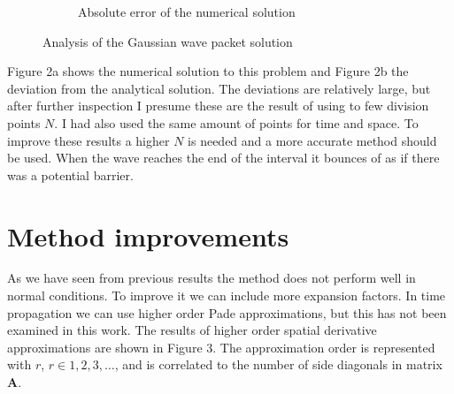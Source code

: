 \documentclass[12pt, a4paper]{article}
\begin{document}
\begin{figure}[hbtp]
\begin{subfigure}{0.5\textwidth}
  \caption{Absolute error of the numerical solution} \label{fig:b}
  \end{subfigure}
  \caption{Analysis of the Gaussian wave packet solution} \label{fig:1}
\end{figure}
 
Figure 2a shows the numerical solution to this problem and Figure 2b the deviation from the analytical solution. The deviations are relatively large, but after further inspection I presume these are the result of using to few division points $N$. I had also used the same amount of points for time and space. To improve these results a higher $N$ is needed and a more accurate method should be used. When the wave reaches the end of the interval it bounces of as if there was a potential barrier.

\newpage


\section{Method improvements}

As we have seen from previous results the method does not perform well in normal conditions. To improve it we can include more expansion factors. In time propagation we can use higher order Pade approximations, but this has not been examined in this work. The results of higher order spatial derivative approximations are shown in Figure 3. The approximation order is represented with $r$, $r \in {1, 2, 3, \dots}$, and is correlated to the number of side diagonals in matrix $\boldsymbol{A}$.
\end{document}
